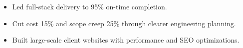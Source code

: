 \vspace{4pt}
\begin{itemize}
  \item Led full-stack delivery to 95\% on-time completion.
  \item Cut cost 15\% and scope creep 25\% through clearer engineering planning.
\end{itemize}
\vspace{4pt}
\begin{itemize}
  \item Built large-scale client websites with performance and SEO optimizations.
\end{itemize}
